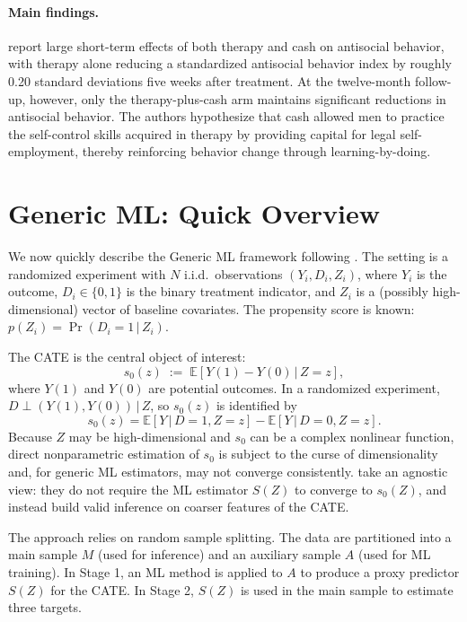 \documentclass[11pt]{article}
\begin{document}
\paragraph{Main findings.}
\citet{blattman2017} report large short-term effects of both therapy and cash
on antisocial behavior, with therapy alone reducing a standardized antisocial behavior
index by roughly 0.20 standard deviations five weeks after treatment. At the
twelve-month follow-up, however, only the therapy-plus-cash arm maintains
significant reductions in antisocial behavior. The authors hypothesize that cash allowed men
to  practice the self-control skills acquired in therapy by providing
capital for legal self-employment, thereby reinforcing behavior change through
learning-by-doing.

\section{Generic ML: Quick Overview}
\label{sec:method}

We now quickly describe the Generic ML framework following \citet{chernozhukov2025}.
The setting is a randomized experiment with $N$ i.i.d.~observations
$(Y_i, D_i, Z_i)$, where $Y_i$ is the outcome, $D_i \in \{0,1\}$ is the
binary treatment indicator, and $Z_i$ is a (possibly high-dimensional) vector
of baseline covariates. The propensity score is known: $p(Z_i) =
\Pr(D_i=1\,|\,Z_i)$.

The CATE is the central object of interest:
\[
s_0(z) \;:=\; \mathbb{E}[Y(1) - Y(0) \,|\, Z=z],
\]
where $Y(1)$ and $Y(0)$ are potential outcomes. In a randomized experiment,
$D \perp (Y(1),Y(0)) \,|\, Z$, so $s_0(z)$ is identified by
\[
s_0(z) = \mathbb{E}[Y\,|\,D=1,Z=z] - \mathbb{E}[Y\,|\,D=0,Z=z].
\]
Because $Z$ may be high-dimensional and $s_0$ can be a complex nonlinear
function, direct nonparametric estimation of $s_0$ is subject to the curse of
dimensionality and, for generic ML estimators, may not converge consistently. \citet{chernozhukov2025} take an agnostic view: they do not
require the ML estimator $S(Z)$ to converge to $s_0(Z)$, and instead build
valid inference on coarser features of the CATE.

The approach relies on random sample splitting. The data are
partitioned into a main sample $M$ (used for inference) and an auxiliary
sample $A$ (used for ML training). In Stage 1, an ML method is applied to $A$
to produce a proxy predictor $S(Z)$ for the CATE. In Stage 2, $S(Z)$ is used
in the main sample to estimate three targets.
\end{document}
